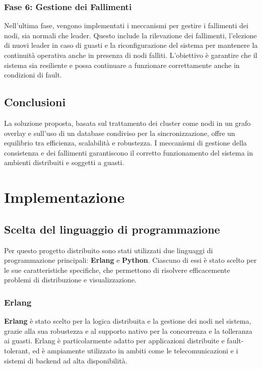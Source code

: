 \documentclass[12pt, a4paper]{report}
\begin{document}
\subsection*{Fase 6: Gestione dei Fallimenti}

Nell'ultima fase, vengono implementati i meccanismi per gestire i fallimenti dei nodi, sia normali che leader. Questo include la rilevazione dei fallimenti, l'elezione di nuovi leader in caso di guasti e la riconfigurazione del sistema per mantenere la continuit\`a operativa anche in presenza di nodi falliti. L'obiettivo \`e garantire che il sistema sia resiliente e possa continuare a funzionare correttamente anche in condizioni di fault.

\section{Conclusioni}

La soluzione proposta, basata sul trattamento dei cluster come nodi in un grafo overlay e sull'uso di un database condiviso per la sincronizzazione, offre un equilibrio tra efficienza, scalabilit\`a e robustezza. I meccanismi di gestione della consistenza e dei fallimenti garantiscono il corretto funzionamento del sistema in ambienti distribuiti e soggetti a guasti.


\newpage

\chapter{Implementazione}

\section{Scelta del linguaggio di programmazione}

Per questo progetto distribuito sono stati utilizzati due linguaggi di programmazione principali: \textbf{Erlang} e \textbf{Python}. Ciascuno di essi è stato scelto per le sue caratteristiche specifiche, che permettono di risolvere efficacemente problemi di distribuzione e visualizzazione.

\subsection{Erlang}

\textbf{Erlang} è stato scelto per la logica distribuita e la gestione dei nodi nel sistema, grazie alla sua robustezza e al supporto nativo per la concorrenza e la tolleranza ai guasti. Erlang è particolarmente adatto per applicazioni distribuite e fault-tolerant, ed è ampiamente utilizzato in ambiti come le telecomunicazioni e i sistemi di backend ad alta disponibilità.
\end{document}
